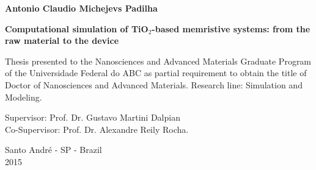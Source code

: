 
\begin{titlepage}


\thispagestyle{empty}

\begin{center}
	\textbf{\Large Antonio Claudio Michejevs Padilha}
	\par
\end{center}

\vspace{2cm}

\begin{center}
	\textbf{\Large Computational simulation of TiO$_2$-based memristive systems: from the raw material to the device} 
	\par
\end{center}

\vspace{4cm}

\begin{flushright}

\begin{minipage}[c][1\totalheight][t]{10.5cm}%
Thesis presented to the Nanosciences and Advanced Materials Graduate Program of the Universidade Federal do ABC as partial requirement to obtain the title of Doctor of Nanosciences and Advanced Materials. Research line: Simulation and Modeling. 
\par
\vspace{2cm}
Supervisor: Prof. Dr. Gustavo Martini Dalpian \\
Co-Supervisor: Prof. Dr. Alexandre Reily Rocha.
\end{minipage}
\par
\end{flushright}

\vspace{5cm}

\begin{center}
Santo André - SP - Brazil\\
2015
\par
\end{center}





\end{titlepage}

